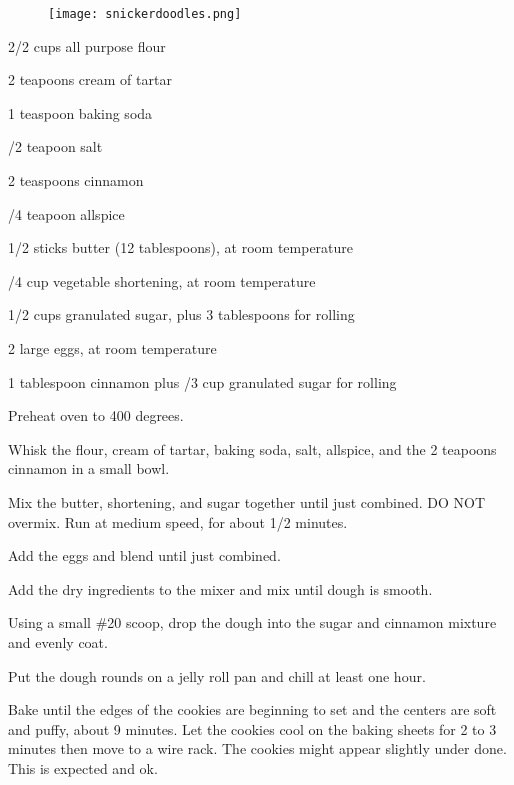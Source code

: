 %
%
%
%
\newpage


\begin{figure}
    \centering
    \texttt{[image: snickerdoodles.png]}
\end{figure}


\begin{IngredientsAndSteps}
    \ListIngredientsAndSteps
    {
        2/2 cups all purpose flour

        2 teapoons cream of tartar

        1 teaspoon baking soda

        /2 teapoon salt

        2 teaspoons cinnamon

        /4 teapoon allspice

        \IngredientsSeparatorClear

        1/2 sticks butter (12 tablespoons), at room temperature

        /4 cup vegetable shortening, at room temperature

        1/2 cups granulated sugar, plus 3 tablespoons for rolling

        2 large eggs, at room temperature

        1 tablespoon cinnamon plus /3 cup granulated sugar for rolling

    }
    {
        Preheat oven to 400 degrees.

        Whisk the flour, cream of tartar, baking soda, salt, allspice, and the 2 teapoons cinnamon
        in a small bowl.

        Mix the butter, shortening, and sugar together until just combined. DO NOT overmix. Run at
        medium speed, for about 1/2 minutes.

        Add the eggs and blend until just combined.

        Add the dry ingredients to the mixer and mix until dough is smooth.

        Using a small \#20 scoop, drop the dough into the sugar and cinnamon mixture and
        evenly coat.

        Put the dough rounds on a jelly roll pan and chill at least one hour.

        Bake until the edges of the cookies are beginning to set and the centers are soft
        and puffy, about 9 minutes. Let the cookies cool on the baking sheets for 2 to 3
        minutes then move to a wire rack. The cookies might appear slightly under done. This
        is expected and ok.
    }
\end{IngredientsAndSteps}

